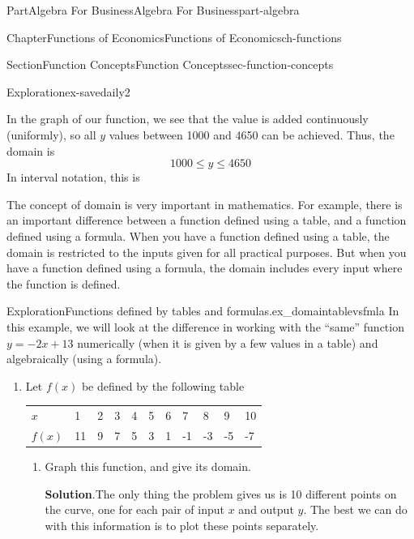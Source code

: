 \documentclass{tufte-book}
\newcommand{\blocktitlefont}{\relax}
\newcommand{\tabularfont}{\relax}
\numberwithin{equation}{chapter}
\begin{document}
\begin{partptx}{Part}{Algebra For Business}{}{Algebra For Business}{}{}{part-algebra}
\begin{chapterptx}{Chapter}{Functions of Economics}{}{Functions of Economics}{}{}{ch-functions}
\begin{sectionptx}{Section}{Function Concepts}{}{Function Concepts}{}{}{sec-function-concepts}
\begin{exploration}{Exploration}{}{ex-savedaily2}
\begin{enumerate}[font=\bfseries,label=(\alph*),ref=\alph*]
\begin{image}{0}{1}{0}{}
{\begin{tikzpicture}
\end{tikzpicture}
}%
\end{image}%
In the graph of our function, we see that the value is added continuously (uniformly), so all \(y\) values between 1000 and 4650 can be achieved. Thus, the domain is%
\begin{equation*}
1000 \leq y \leq 4650
\end{equation*}
In interval notation, this is%
\begin{equation*}
[1000,4650]
\end{equation*}
%
\end{enumerate}%
\end{exploration}%
The concept of domain is very important in mathematics.  For example, there is an important difference between a function defined using a table, and a function defined using a formula. When you have a function defined using a table, the domain is restricted to the inputs given for all practical purposes. But when you have a function defined using a formula, the domain includes every input where the function is defined.%
\begin{exploration}{Exploration}{Functions defined by tables and formulas.}{ex_domaintablevsfmla}%
In this example, we will look at the difference in working with the ``same'' function \(y = -2x + 13\) numerically (when it is given by a few values in a table) and algebraically (using a formula).%
\begin{enumerate}[font=\bfseries,label=(\alph*),ref=\alph*]%
\item{}Let \(f(x)\) be defined by the following table  \begin{center}%
{\tabularfont%
\begin{tabular}{lllllllllll}
\(x\)&1&2&3&4&5&6&7&8&9&10\tabularnewline[0pt]
\(f(x)\)&11&9&7&5&3&1&-1&-3&-5&-7
\end{tabular}
}%
\end{center}%
%
\begin{enumerate}[font=\bfseries,label=(\roman*),ref=\theenumi.\roman*]%
\item{}Graph this function, and give its domain.%
\par\smallskip%
\noindent\textbf{\blocktitlefont Solution}.\hypertarget{ex_domaintablevsfmla-3-2-2}{}\quad{}The only thing the problem gives us is 10 different points on the curve, one for each pair of input \(x\) and output \(y\).  The best we can do with this information is to plot these points separately.%
\begin{image}{0.25}{0.5}{0.25}{}%

\end{image}
\end{enumerate}
\end{enumerate}
\end{exploration}
\end{sectionptx}
\end{chapterptx}
\end{partptx}
\end{document}
